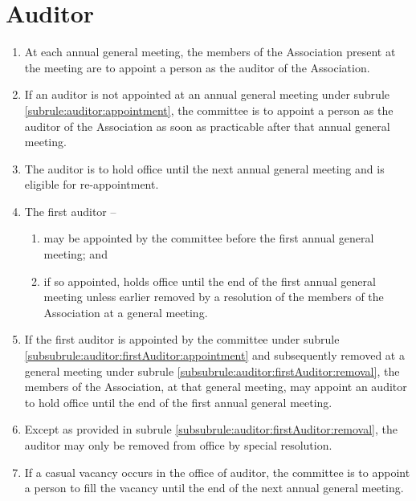 \section{Auditor}
\label{rule:auditor}

\begin{enumerate}
	\item \label{subrule:auditor:appointment} At each annual general meeting, the members of the Association present at the meeting are to appoint a person as the auditor of the Association.
	\item If an auditor is not appointed at an annual general meeting under subrule \ref{subrule:auditor:appointment}, the committee is to appoint a person as the auditor of the Association as soon as practicable after that annual general meeting.
	\item The auditor is to hold office until the next annual general meeting and is eligible for re-appointment.
	
	\item \label{subrule:auditor:firstAuditor} The first auditor --
	\begin{enumerate}
		\item \label{subsubrule:auditor:firstAuditor:appointment} may be appointed by the committee before the first annual general meeting; and	
		\item \label{subsubrule:auditor:firstAuditor:removal} if so appointed, holds office until the end of the first annual general meeting unless earlier removed by a resolution of the members of the Association at a general meeting.
	\end{enumerate}

	\item If the first auditor is appointed by the committee under subrule \ref{subsubrule:auditor:firstAuditor:appointment} and subsequently removed at a general meeting under subrule \ref{subsubrule:auditor:firstAuditor:removal}, the members of the Association, at that general meeting, may appoint an auditor to hold office until the end of the first annual general meeting.
	\item Except as provided in subrule \ref{subsubrule:auditor:firstAuditor:removal}, the auditor may only be removed from office by special resolution.
	\item If a casual vacancy occurs in the office of auditor, the committee is to appoint a person to fill the vacancy until the end of the next annual general meeting.
\end{enumerate}